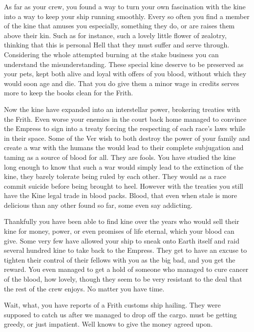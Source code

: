 \documentclass[char]{guildcamp4}
\begin{document}
As far as your crew, you found a way to turn your own fascination with the kine into a way to keep your ship running smoothly. Every so often you find a member of the kine that amuses you especially, something they do, or are raises them above their kin. Such as \cJoan{} for instance, such a lovely little flower of zealotry, thinking that this is \cJoan{\their} personal Hell that they must suffer and serve through. Considering the whole attempted burning at the stake business you can understand the misunderstanding. These special kine deserve to be preserved as your pets, kept both alive and loyal with offers of you blood, without which they would soon age and die. That you do give them a minor wage in credits serves more to keep the books clean for the Frith.

Now the kine have expanded into an interstellar power, brokering treaties with the Frith. Even worse your enemies in the court back home managed to convince the Empress to sign into a treaty forcing the respecting of each race's laws while in their space. Some of the Ver wish to both destroy the power of your family and create a war with the humans the would lead to their complete subjugation and taming as a source of blood for all. They are fools. You have studied the kine long enough to know that such a war would simply lead to the extinction of the kine, they barely tolerate being ruled by each other. They would as a race commit suicide before being brought to heel. However with the treaties you still have the Kine legal trade in blood packs. Blood, that even when stale is more delicious than any other found so far, some even say addicting. 

Thankfully you have been able to find kine over the years who would sell their kine for money, power, or even promises of life eternal, which your blood can give. Some very few have allowed your ship to sneak onto Earth itself and raid several hundred kine to take back to the Empress. They get to have an excuse to tighten their control of their fellows with you as the big bad, and you get the reward. You even managed to get a hold of \cSpite{} someone who managed to cure cancer of the blood, how lovely, though they seem to be very resistant to the deal that the rest of the crew enjoys. No matter you have time.

Wait, what, you have reports of a Frith customs ship hailing. They were supposed to catch us after we managed to drop off the cargo. \cCbad{} must be getting greedy, or just impatient. Well \cVtwo{} knows to give \cCbad{\them} the money agreed upon.
\end{document}
